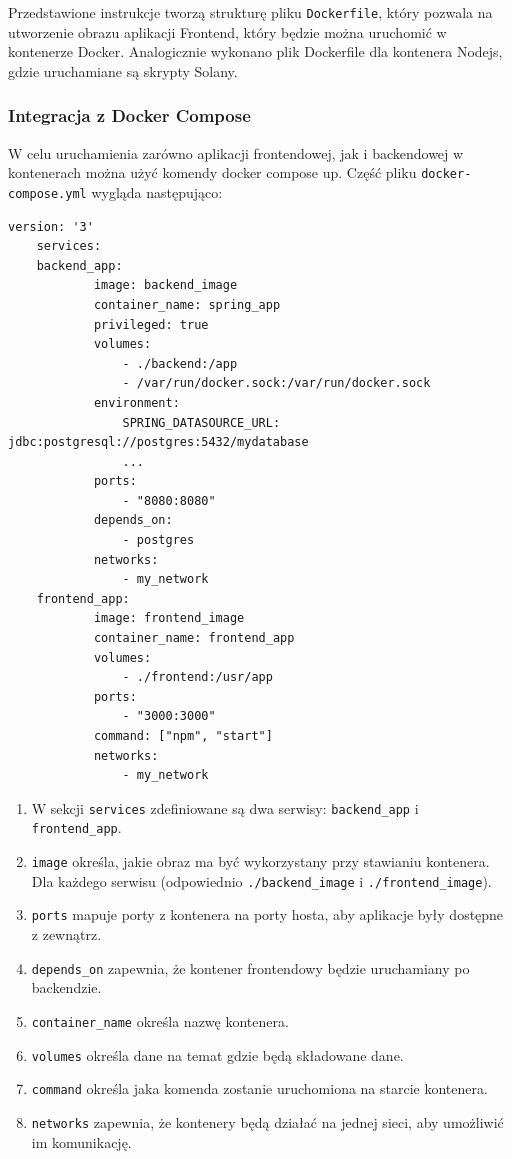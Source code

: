 Przedstawione instrukcje tworzą strukturę pliku \texttt{Dockerfile}, który pozwala na utworzenie obrazu aplikacji Frontend, który będzie można uruchomić w kontenerze Docker. Analogicznie wykonano plik Dockerfile dla kontenera Nodejs, gdzie uruchamiane są skrypty Solany.

\subsubsection{Integracja z Docker Compose}
W celu uruchamienia zarówno aplikacji frontendowej, jak i backendowej w kontenerach można użyć komendy docker compose up. Część pliku \texttt{docker-compose.yml} wygląda następująco:

\begin{lstlisting}[tabsize=2,basicstyle=\footnotesize\ttfamily]
version: '3'
	services:
    backend_app:
			image: backend_image
			container_name: spring_app
			privileged: true
			volumes:
				- ./backend:/app
				- /var/run/docker.sock:/var/run/docker.sock
			environment:
				SPRING_DATASOURCE_URL: jdbc:postgresql://postgres:5432/mydatabase
				...
			ports:
				- "8080:8080"
			depends_on:
				- postgres
			networks:
				- my_network
    frontend_app:
			image: frontend_image
			container_name: frontend_app
			volumes:
				- ./frontend:/usr/app
			ports:
				- "3000:3000"
			command: ["npm", "start"]
			networks:
				- my_network
\end{lstlisting}

\begin{enumerate}
    \item W sekcji \texttt{services} zdefiniowane są dwa serwisy: \texttt{backend\_app} i \texttt{frontend\_app}.
    \item \texttt{image} określa, jakie obraz ma być wykorzystany przy stawianiu kontenera. Dla każdego serwisu (odpowiednio \texttt{./backend\_image} i \texttt{./frontend\_image}).
    \item \texttt{ports} mapuje porty z kontenera na porty hosta, aby aplikacje były dostępne z zewnątrz.
    \item \texttt{depends\_on} zapewnia, że kontener frontendowy będzie uruchamiany po backendzie.
		\item \texttt{container\_name} określa nazwę kontenera.
		\item \texttt{volumes} określa dane na temat gdzie będą składowane dane.
		\item \texttt{command} określa jaka komenda zostanie uruchomiona na starcie kontenera.
		\item \texttt{networks} zapewnia, że kontenery będą działać na jednej sieci, aby umożliwić im komunikację.
\end{enumerate}

